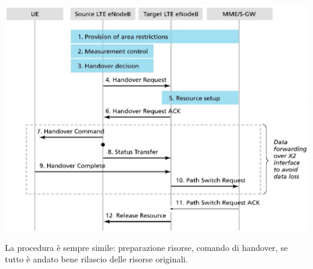 \begin{center}
	\includegraphics[width=0.94\linewidth]{img/4g/hand2}
\end{center}

La procedura è sempre simile: preparazione risorse, comando di handover, se tutto è andato bene rilascio delle risorse originali.\\